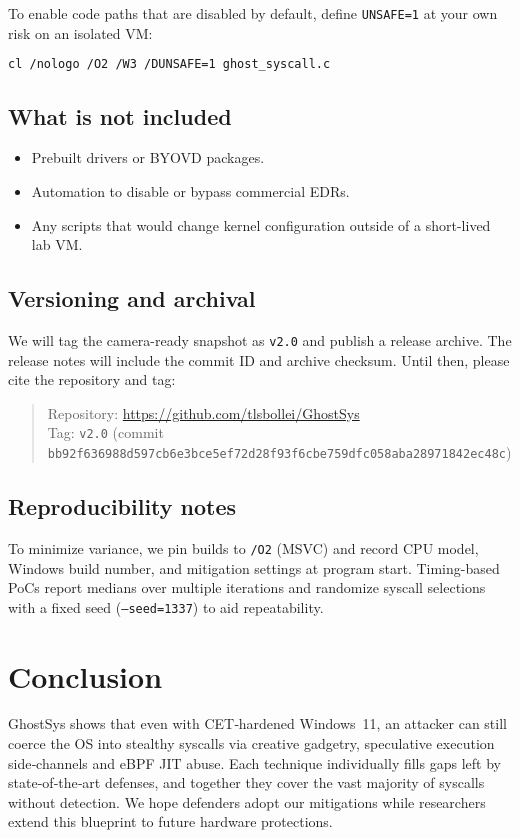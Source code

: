 \documentclass[11pt,letterpaper]{article}
\begin{document}
\noindent
To enable code paths that are disabled by default, define \texttt{UNSAFE=1} at your own risk on an isolated VM:
\begin{lstlisting}[language=bash,basicstyle=\footnotesize\ttfamily]
cl /nologo /O2 /W3 /DUNSAFE=1 ghost_syscall.c
\end{lstlisting}

\subsection{What is not included}
\begin{itemize}
  \item Prebuilt drivers or BYOVD packages.
  \item Automation to disable or bypass commercial EDRs.
  \item Any scripts that would change kernel configuration outside of a short-lived lab VM.
\end{itemize}

\subsection{Versioning and archival}
We will tag the camera-ready snapshot as \texttt{v2.0} and publish a release archive. The release notes will include the commit ID and archive checksum. Until then, please cite the repository and tag:
\begin{quote}\footnotesize
Repository: \url{https://github.com/tlsbollei/GhostSys} \\
Tag: \texttt{v2.0} (commit \texttt{bb92f636988d597cb6e3bce5ef72d28f93f6cbe759dfc058aba28971842ec48c})
\end{quote}

\subsection{Reproducibility notes}
To minimize variance, we pin builds to \texttt{/O2} (MSVC) and record CPU model, Windows build number, and mitigation settings at program start. Timing-based PoCs report medians over multiple iterations and randomize syscall selections with a fixed seed (\texttt{--seed=1337}) to aid repeatability.


\section{Conclusion}
\label{sec:conclusion}
GhostSys shows that even with CET‑hardened Windows 11, an attacker can still coerce the OS into stealthy syscalls via creative gadgetry, speculative execution side‑channels and eBPF JIT abuse. Each technique individually fills gaps left by state‑of‑the‑art defenses, and together they cover the vast majority of syscalls without detection. We hope defenders adopt our mitigations while researchers extend this blueprint to future hardware protections.
\end{document}
